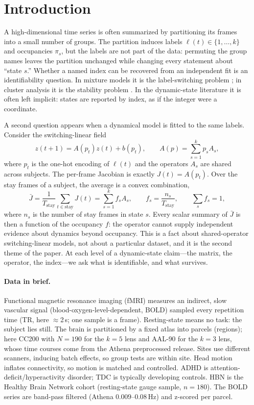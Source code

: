 \documentclass[11pt]{article}
\theoremstyle{definition}
\begin{document}
\section{Introduction}

A high-dimensional time series is often summarized by partitioning its frames into a
small number of groups. The partition induces labels $\ell(t)\in\{1,\dots,k\}$ and
occupancies $\pi_s$, but the labels are not part of the data: permuting the group names
leaves the partition unchanged while changing every statement about ``state $s$.''
Whether a named index can be recovered from an independent fit is an identifiability
question. In mixture models it is the label-switching problem
\cite{Stephens2000,Jasra2005}; in cluster analysis it is the stability problem
\cite{Hennig2007,vonLuxburg2010}. In the dynamic-state literature it is often left
implicit: states are reported by index, as if the integer were a coordinate.

A second question appears when a dynamical model is fitted to the same labels. Consider
the switching-linear field
\begin{equation}
z(t+1)=A(p_t)z(t)+b(p_t),
\qquad
A(p)=\sum_{s=1}^{k}p_sA_s,
\end{equation}
where $p_t$ is the one-hot encoding of $\ell(t)$ and the operators $A_s$ are shared
across subjects. The per-frame Jacobian is exactly $J(t)=A(p_t)$. Over the stay frames
of a subject, the average is a convex combination,
\begin{equation}
\bar J=\frac1{T_{\mathrm{stay}}}\sum_{t\in\mathrm{stay}}J(t)
=\sum_{s=1}^{k}f_sA_s,
\qquad
f_s=\frac{n_s}{T_{\mathrm{stay}}},
\qquad
\sum_s f_s=1,
\end{equation}
where $n_s$ is the number of stay frames in state $s$. Every scalar summary of $\bar J$
is then a function of the occupancy $f$: the operator cannot supply independent evidence
about dynamics beyond occupancy. This is a fact about shared-operator switching-linear
models, not about a particular dataset, and it is the second theme of the paper.
At each level of a dynamic-state claim---the matrix, the operator, the index---we ask
what is identifiable, and what survives.

\paragraph{Data in brief.} Functional magnetic resonance imaging (fMRI) measures an
indirect, slow vascular signal (blood-oxygen-level-dependent, BOLD) sampled every
repetition time (TR, here $\approx$2\,s; one sample is a frame). Resting-state means
no task: the subject lies still. The brain is partitioned by a fixed atlas into
parcels (regions); here CC200 with $N=190$ for the $k=5$ lens and AAL-90 for the
$k=3$ lens, whose time courses come from the Athena preprocessed release. Sites use
different scanners, inducing batch effects, so group tests are within site. Head
motion inflates connectivity, so motion is matched and controlled. ADHD is attention-
deficit/hyperactivity disorder; TDC is typically developing controls. HBN is the
Healthy Brain Network cohort (resting-state gauge sample, $n=180$). The BOLD series
are band-pass filtered (Athena $0.009$--$0.08$\,Hz) and z-scored per parcel.
\end{document}

